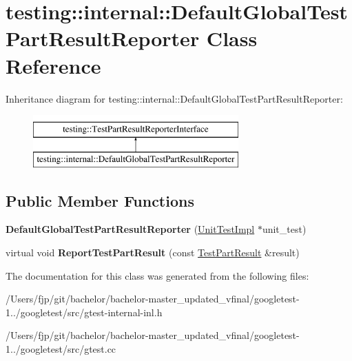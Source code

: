 \hypertarget{classtesting_1_1internal_1_1_default_global_test_part_result_reporter}{}\section{testing\+:\+:internal\+:\+:Default\+Global\+Test\+Part\+Result\+Reporter Class Reference}
\label{classtesting_1_1internal_1_1_default_global_test_part_result_reporter}
Inheritance diagram for testing\+:\+:internal\+:\+:Default\+Global\+Test\+Part\+Result\+Reporter\+:\begin{figure}[H]
\begin{center}
\leavevmode
\includegraphics[height=2.000000cm]{classtesting_1_1internal_1_1_default_global_test_part_result_reporter}
\end{center}
\end{figure}
\subsection*{Public Member Functions}
\begin{DoxyCompactItemize}
\item 
\mbox{\label{classtesting_1_1internal_1_1_default_global_test_part_result_reporter_a3900ea7f34b34afd48c7d1d0312a1488}} 
{\bfseries Default\+Global\+Test\+Part\+Result\+Reporter} (\mbox{\hyperlink{classtesting_1_1internal_1_1_unit_test_impl}{Unit\+Test\+Impl}} $\ast$unit\+\_\+test)
\item 
\mbox{\label{classtesting_1_1internal_1_1_default_global_test_part_result_reporter_a6081576a23b964cfecab1e424d8044fc}} 
virtual void {\bfseries Report\+Test\+Part\+Result} (const \mbox{\hyperlink{classtesting_1_1_test_part_result}{Test\+Part\+Result}} \&result)
\end{DoxyCompactItemize}


The documentation for this class was generated from the following files\+:\begin{DoxyCompactItemize}
\item 
/\+Users/fjp/git/bachelor/bachelor-\/master\+\_\+updated\+\_\+vfinal/googletest-\/1../googletest/src/gtest-\/internal-\/inl.\+h\item 
/\+Users/fjp/git/bachelor/bachelor-\/master\+\_\+updated\+\_\+vfinal/googletest-\/1../googletest/src/gtest.\+cc\end{DoxyCompactItemize}
